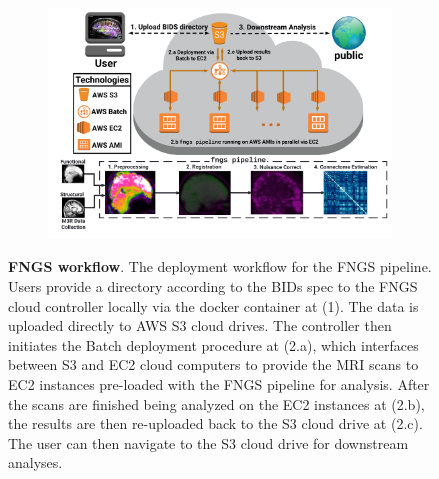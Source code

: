 \documentclass[simplex.tex]{subfiles}
\begin{document}
\begin{figure}[h!]
\begin{cframed}[lgray]
\centering
\begin{subfigure}[h]{1\textwidth}
\includegraphics[width=\textwidth]{../../figs/fngs-workflow.png}
\end{subfigure}
\caption{\textbf{FNGS workflow}. The deployment workflow for the FNGS pipeline. Users provide a directory according to the BIDs spec to the FNGS cloud controller locally via the docker container at (1). The data is uploaded directly to AWS S3 cloud drives. The controller then initiates the Batch deployment procedure at (2.a), which interfaces between S3 and EC2 cloud computers to provide the MRI scans to EC2 instances pre-loaded with the FNGS pipeline for analysis. After the scans are finished being analyzed on the EC2 instances at (2.b), the results are then re-uploaded back to the S3 cloud drive at (2.c). The user can then navigate to the S3 cloud drive for downstream analyses.}
\label{fig:fngs-workflow}
\end{cframed}
\end{figure}

\clearpage
\end{document}
